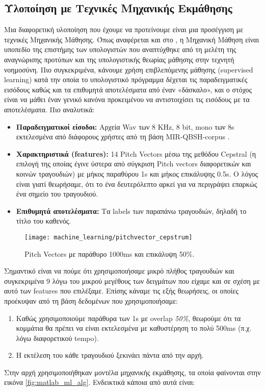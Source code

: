 \subsection{Υλοποίηση με Τεχνικές Μηχανικής Εκμάθησης}
Μια διαφορετική υλοποίηση που έχουμε να προτείνουμε είναι μια προσέγγιση με τεχνικές Μηχανικής Μάθησης. Όπως αναφέρεται και στο \cite{mldef}, η Μηχανική Μάθηση είναι υποπεδίο της επιστήμης των υπολογιστών που αναπτύχθηκε από τη μελέτη της αναγνώρισης προτύπων και της  υπολογιστικής θεωρίας μάθησης στην τεχνητή νοημοσύνη. Πιο συγκεκριμένα, κάνουμε χρήση επιβλεπόμενης μάθησης (supervised learning) κατά την οποία το υπολογιστικό πρόγραμμα δέχεται τις παραδειγματικές εισόδους καθώς και τα επιθυμητά αποτελέσματα από έναν «δάσκαλο», και ο στόχος είναι να μάθει έναν γενικό κανόνα προκειμένου να αντιστοιχίσει τις εισόδους με τα αποτελέσματα.
Πιο αναλυτικά:
\begin{itemize}
	\item \textbf{Παραδειγματικοί είσοδοι:} Αρχεία Wav των 8 KHz, 8 bit, mono των 8s εκτελεσμένα από διάφορους χρήστες από τη βάση MIR-QBSH-corpus \cite{jang-dataset}.
	\item \textbf{Χαρακτηριστικά (features):} 14 Pitch Vectors μέσω της μεθόδου Cepstral\cite{cepstral} (η επιλογή της οποίας έγινε ύστερα από σύγκριση Pitch vectors διαφορετικών και κοινών τραγουδιών) με μήκος παραθύρου 1s και μήκος επικάλυψης 0.5s. Ο λόγος είναι γιατί θεωρήσαμε, ότι το ένα δευτερόλεπτο αρκεί για να περιγράψει επαρκώς ένα σημείο του τραγουδιού.
	\item \textbf{Επιθυμητά αποτελέσματα:} Τα labels των παραπάνω τραγουδιών, δηλαδή το τίτλο του καθενός.
\end{itemize}

\begin{figure}
	\centering
	\vspace{-20pt}\texttt{[image: machine\_learning/pitchvector\_cepstrum]}
	\vspace{-20pt}\caption{Pitch Vectors με παράθυρο 1000ms και επικάλυψη 50\%.}
	\label{fig:pvcepstrum}
\end{figure}

Σημαντικό είναι να πούμε ότι χρησιμοποιήσαμε μικρό πλήθος τραγουδιών και συγκεκριμένα 9 λόγω του μικρού μεγέθους των δειγμάτων που είχαμε και σε σχέση με αυτό των features που επιλέξαμε. Επίσης κάναμε τις εξής θεωρήσεις, οι οποίες προέκυψαν από τη βάση δεδομένων που χρησιμοποιήσαμε:
\begin{enumerate}
	\item Καθώς χρησιμοποιούμε παράθυρα των 1s με overlap \textit{50\%}, θεωρούμε ότι τα κομμάτια θα πρέπει να είναι εκτελεσμένα με καθυστέρηση το πολύ 500ms (π.χ. λόγω διαφορετικού tempo).
	\item Η εκτέλεση του κάθε τραγουδιού ξεκινάει πάντα από την αρχή.
\end{enumerate}
Στην αρχή χρησιμοποιήθηκαν μοντέλα μηχανικής εκμάθησης, τα οποία φαίνονται στην εικόνα \ref{fig:matlab_ml_alg}. Ενδεικτικά κάποια από αυτά είναι:

